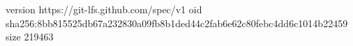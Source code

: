 version https://git-lfs.github.com/spec/v1
oid sha256:8bb815525db67a232830a09fb8b1ded44c2fab6e62c80febc4dd6c1014b22459
size 219463
